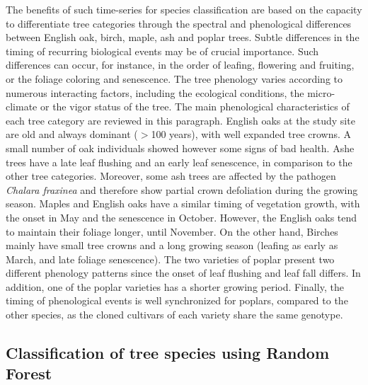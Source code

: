 \documentclass[remotesensing,article,submit,moreauthors,pdftex,12pt,a4paper]{mdpi} %
\begin{document}
The benefits of such time-series for species classification are based on the capacity to differentiate tree categories through the spectral and phenological differences between English oak, birch, maple, ash and poplar trees. 
Subtle differences in the timing of recurring biological events may be of crucial importance. Such differences can occur, for instance, in the order of leafing, flowering and fruiting, or the foliage coloring and senescence. 
The tree phenology varies according to numerous interacting factors, including the ecological conditions, the micro-climate or the vigor status of the tree.
The main phenological characteristics of each tree category are reviewed in this paragraph. 
English oaks at the study site are old and always dominant ($>$100 years), with well expanded tree crowns.
A small number of oak individuals showed however some signs of bad health. 
Ashe trees have a late leaf flushing and an early leaf senescence, in comparison to the other tree categories. 
Moreover, some ash trees are affected by the pathogen \textit{Chalara fraxinea} \cite{husson_chalara_2011} and therefore show partial crown defoliation during the growing season. 
Maples and English oaks have a similar timing of vegetation growth, with the onset in May and the senescence in October. However, the English oaks tend to maintain their foliage longer, until November. 
On the other hand, Birches mainly have small tree crowns and a long growing season (leafing as early as March, and late foliage senescence). 
The two varieties of poplar present two different phenology patterns since the onset of leaf flushing and leaf fall differs. 
In addition, one of the poplar varieties has a shorter growing period.
Finally, the timing of phenological events is well synchronized for poplars, compared to the other species, as the cloned cultivars of each variety share the same genotype.


\subsection{Classification of tree species using Random Forest} %
\end{document}
